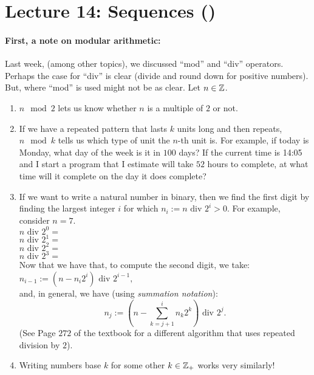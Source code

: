 \section*{Lecture 14: Sequences ()}

\paragraph{First, a note on modular arithmetic:}

Last week, (among other topics), we discussed ``mod'' and ``div'' operators.
Perhaps the case for ``div'' is clear (divide and round down for positive
numbers).  But, where ``mod'' is used might not be as clear.  Let $n \in {\mathbb Z}$.
\begin{enumerate}
    \item $n \mod 2$ lets us know whether $n$ is a multiple of $2$ or not.
    \item If we have a repeated pattern that lasts $k$ units long and then
        repeats, $n \mod k$ tells us which type of unit the $n$-th unit is.
        For example, if today is Monday, what day of the week is it in $100$
        days? If the current time is 14:05 and I start a program that I estimate
        will take $52$ hours to complete, at what time will it complete on the
        day it does complete?
    \item If we want to write a natural number in binary, then we find the first digit
        by finding the largest integer $i$ for which $n_i:=n\text{ div } 2^i >0$.
        For example, consider $n=7$.\\
        $n\text{ div } 2^0=$\\
        $n\text{ div } 2^1=$\\
        $n\text{ div } 2^2=$\\
        $n\text{ div } 2^3=$\\
        Now that we have that, to compute the second digit, we take:
        $n_{i-1}:=(n-n_i2^i) \text{ div } 2^{i-1},$\\
        and, in general, we have (using \emph{summation notation}):
        $$
            n_j := \left(n- \sum_{k=j+1}^{i} n_k2^k \right) \text{ div } 2^{j}.
        $$
        \practice
        (See Page $272$ of the textbook for a different algorithm that uses repeated
        division by $2$).
    \item Writing numbers base $k$ for some other $k \in {\mathbb Z}_{+}$ works very
        similarly!
\end{enumerate}

